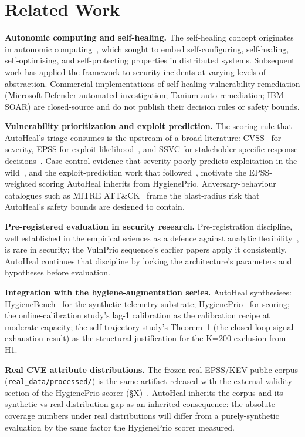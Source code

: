 \section{Related Work}

\textbf{Autonomic computing and self-healing.}
The self-healing concept originates in autonomic
computing~\cite{kephart2003vision}, which sought to embed
self-configuring, self-healing, self-optimising, and
self-protecting properties in distributed systems. Subsequent work
has applied the framework to security incidents at varying levels
of abstraction. Commercial implementations of self-healing
vulnerability remediation (Microsoft Defender automated
investigation; Tanium auto-remediation; IBM SOAR) are closed-source
and do not publish their decision rules or safety bounds.

\textbf{Vulnerability prioritization and exploit prediction.}
The scoring rule that AutoHeal's triage consumes is the upstream of a
broad literature: CVSS~\cite{mell2007cvss} for severity, EPSS for
exploit likelihood~\cite{jacobs2021epss}, and SSVC for
stakeholder-specific response decisions~\cite{spring2021ssvc}.
Case-control evidence that severity poorly predicts exploitation in
the wild~\cite{allodi2014comparing}, and the exploit-prediction work
that followed~\cite{sabottke2015vulnerability,bullough2017predicting},
motivate the EPSS-weighted scoring AutoHeal inherits from HygienePrio.
Adversary-behaviour catalogues such as MITRE
ATT\&CK~\cite{strom2020attack} frame the blast-radius risk that
AutoHeal's safety bounds are designed to contain.

\textbf{Pre-registered evaluation in security research.}
Pre-registration discipline, well established in the empirical
sciences as a defence against analytic
flexibility~\cite{nosek2018preregistration}, is rare in security;
the VulnPrio sequence's earlier papers apply it consistently.
AutoHeal continues that discipline by locking the architecture's
parameters and hypotheses before evaluation.

\textbf{Integration with the hygiene-augmentation series.} AutoHeal synthesises:
HygieneBench~\cite{paper3hygienebench} for the synthetic
telemetry substrate;
HygienePrio~\cite{paper4hygieneprio} for scoring;
the online-calibration study's lag-1 calibration as the
calibration recipe at moderate capacity; the self-trajectory study's
Theorem~1 (the closed-loop signal exhaustion
result) as the structural justification for the K=200 exclusion
from H1.

\textbf{Real CVE attribute distributions.} The frozen real
EPSS/KEV public corpus (\texttt{real\_data/processed/}) is the
same artifact released with the external-validity section of
the HygienePrio scorer (\S X)~\cite{paper4hygieneprio}.
AutoHeal inherits the corpus and its synthetic-vs-real distribution
gap as an inherited consequence: the absolute coverage numbers
under real distributions will differ from a purely-synthetic
evaluation by the same factor the HygienePrio scorer measured.

